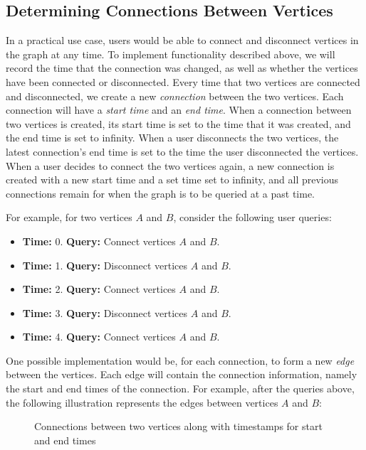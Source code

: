 \documentclass[12pt]{article}
\begin{document}
\subsection{Determining Connections Between Vertices}

In a practical use case, users would be able to connect and disconnect vertices in the graph at any time. To implement functionality described above, we will record the time that the connection was changed, as well as whether the vertices have been connected or disconnected. Every time that two vertices are connected and disconnected, we create a new \textit{connection} between the two vertices. Each connection will have a \textit{start time} and an \textit{end time}. When a connection between two vertices is created, its start time is set to the time that it was created, and the end time is set to infinity. When a user disconnects the two vertices, the latest connection's end time is set to the time the user disconnected the vertices. When a user decides to connect the two vertices again, a new connection is created with a new start time and a set time set to infinity, and all previous connections remain for when the graph is to be queried at a past time.

For example, for two vertices \(A\) and \(B\), consider the following user queries:
\begin{itemize}
    \item \textbf{Time:} 0. \textbf{Query:} Connect vertices \(A\) and \(B\).
    \item \textbf{Time:} 1. \textbf{Query:} Disconnect vertices \(A\) and \(B\).
    \item \textbf{Time:} 2. \textbf{Query:} Connect vertices \(A\) and \(B\).
    \item \textbf{Time:} 3. \textbf{Query:} Disconnect vertices \(A\) and \(B\).
    \item \textbf{Time:} 4. \textbf{Query:} Connect vertices \(A\) and \(B\).
\end{itemize}

One possible implementation would be, for each connection, to form a new \textit{edge} between the vertices. Each edge will contain the connection information, namely the start and end times of the connection. For example, after the queries above, the following illustration represents the edges between vertices \(A\) and \(B\):
\begin{figure}[H]
    \centering
    \fontsize{11pt}{2pt}\selectfont
    \def\svgwidth{4in}
    
    \caption{Connections between two vertices along with timestamps for start and end times}
\end{figure}
\end{document}
